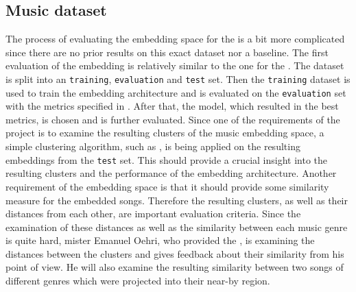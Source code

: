 \subsection{Music dataset}
\label{sub:Eval-Music}
The process of evaluating the embedding space for the  is a bit more complicated since there are no prior results on this exact dataset nor a baseline. The first evaluation of the embedding is relatively similar to the one for the . The dataset is split into an \texttt{training}, \texttt{evaluation} and \texttt{test} set. Then the \texttt{training} dataset is used to train the embedding architecture and is evaluated on the \texttt{evaluation} set with the metrics specified in . After that, the model, which resulted in the best metrics, is chosen and is further evaluated.
\newline
\newline
Since one of the requirements of the project is to examine the resulting clusters of the music embedding space, a simple clustering algorithm, such as , is being applied on the resulting embeddings from the \texttt{test} set. This should provide a crucial insight into the resulting clusters and the performance of the embedding architecture.
\newline
\newline
Another requirement of the embedding space is that it should provide some similarity measure for the embedded songs. Therefore the resulting clusters, as well as their distances from each other, are important evaluation criteria. Since the examination of these distances as well as the similarity between each music genre is quite hard, mister Emanuel Oehri, who provided the , is examining the distances between the clusters and gives feedback about their similarity from his point of view. He will also examine the resulting similarity between two songs of different genres which were projected into their near-by region.


